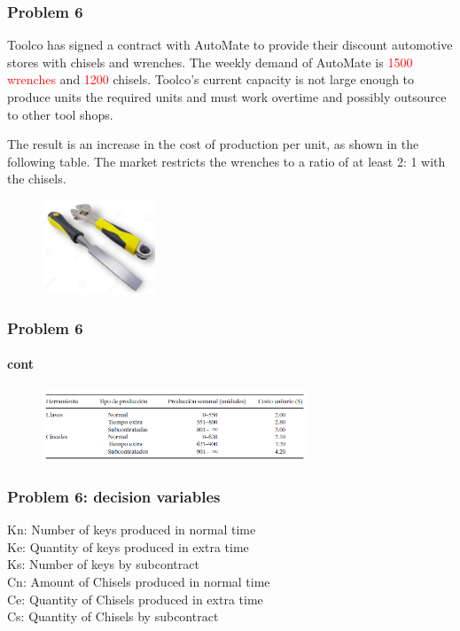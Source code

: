 \documentclass[10pt,svgnames,fragile]{beamer}
\begin{document}
\begin{frame}
\frametitle{Problem 6}


Toolco has signed a contract with AutoMate to provide their discount automotive stores with chisels and wrenches. The weekly demand of AutoMate is \textcolor{red}{1500 wrenches} and \textcolor{red}{1200} chisels. Toolco's current capacity is not large enough to produce units the required units and must work overtime and possibly outsource to other tool shops.

The result is an increase in the cost of production per unit, as shown in the following table. The market restricts the wrenches to a ratio of at least 2: 1 with the chisels.

\begin{figure}
\includegraphics[width=0.3\textwidth]{images/F.png}
\end{figure}



\end{frame}


\begin{frame}
\frametitle{Problem 6}
\framesubtitle{cont}

\begin{figure}
\includegraphics[width=0.7\textwidth]{images/io9.PNG}
\end{figure}


\end{frame}


\begin{frame}[label={sec:orge9abdcb}]{}
\frametitle{Problem 6: decision variables }

Kn: Number of keys produced in normal time\\
Ke: Quantity of keys produced in extra time\\
Ks: Number of keys by subcontract\\

Cn: Amount of Chisels produced in normal time\\
Ce: Quantity of Chisels produced in extra time\\
Cs: Quantity of Chisels by subcontract\\

\end{frame}
\end{document}
